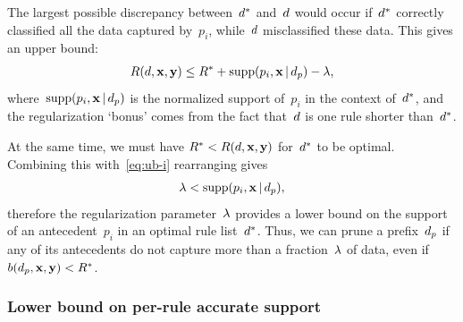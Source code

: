 The largest possible discrepancy between~$d^*$ and~${d}$ would occur
if~$d^*$ correctly classified all the data captured by~$p_i$,
while~${d}$ misclassified these data.
%
This gives an upper bound:
\begin{align}
\Obj(\RL, \x, \y) \le \OptimalObj + \Supp(p_i, \x \given \Prefix) - \Reg,
\label{eq:ub-i}
\end{align}
where~$\text{supp}(p_i, \mathbf{x} \,|\, d_p)$ is the normalized support of~$p_i$
in the context of~$d^*$, and the regularization `bonus'
comes from the fact that~${d}$ is one rule shorter than~$d^*$.

At the same time, we must have ${R^* < R({d}, \mathbf{x}, \mathbf{y})}$ for~$d^*$ to be optimal.
%
Combining this with~\eqref{eq:ub-i} rearranging gives
\begin{align}
\Reg < \Supp(p_i, \x \given \Prefix),
\label{eq:min-capture}
\end{align}
therefore the regularization parameter~${\lambda}$ provides a lower bound
on the support of an antecedent~$p_i$ in an optimal rule list~$d^*$.
%
Thus, we can prune a prefix~$d_p$ if any of its antecedents do not capture
more than a fraction~${\lambda}$ of data, even if~${b(d_p, \mathbf{x}, \mathbf{y}) < R^*}$.

\subsubsection{Lower bound on per-rule accurate support}

